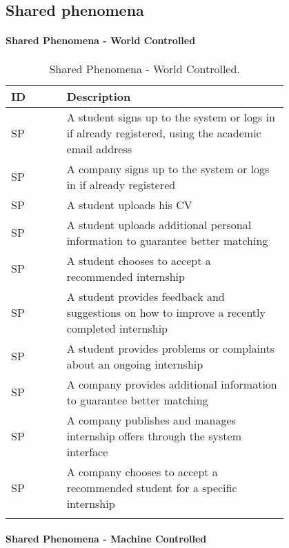 \subsection{Shared phenomena}
\label{subsec:shared_phenomena}%
\setcounter{sp}{1}
\newcommand{\csp} {\thesp\stepcounter{sp}}
\begin{center}
\renewcommand{\arraystretch}{2}

\paragraph{Shared Phenomena - World Controlled}

\begin{longtable}{ l p{0.8\linewidth} }
    \hline
    \textbf{ID} & \textbf{Description} \\ 
    \hline
    SP\csp & A student signs up to the system or logs in if already registered, using the academic email address \\ 
    \hline
    SP\csp & A company signs up to the system or logs in if already registered \\ 
    \hline
    SP\csp & A student uploads his CV \\ 
    \hline
    SP\csp & A student uploads additional personal information to guarantee better matching \\ 
    \hline
    SP\csp & A student chooses to accept a recommended internship \\ 
    \hline
    SP\csp & A student provides feedback and suggestions on how to improve a recently completed internship \\ 
    \hline
    SP\csp & A student provides problems or complaints about an ongoing internship \\ 
    \hline
    SP\csp & A company provides additional information to guarantee better matching \\ 
    \hline
    SP\csp & A company publishes and manages internship offers through the system interface \\ 
    \hline
    SP\csp & A company chooses to accept a recommended student for a specific internship \\ 
    \hline
    \caption{Shared Phenomena - World Controlled.}
    \label{tab:sharedph_world_tab}%
\end{longtable}

\paragraph{Shared Phenomena - Machine Controlled}


\end{center}
